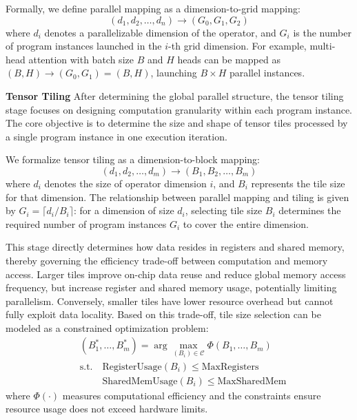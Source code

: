 \documentclass{article}
\theoremstyle{plain}
\theoremstyle{definition}
\theoremstyle{remark}
\begin{document}
Formally, we define parallel mapping as a dimension-to-grid mapping:
  \begin{equation}
  (d_1, d_2, \ldots, d_n) \rightarrow (G_0, G_1, G_2)
  \end{equation}
where $d_i$ denotes a parallelizable dimension of the operator, and $G_i$ is the number of program instances launched in the $i$-th grid dimension. For example, multi-head attention with batch size $B$ and $H$ heads can be mapped as $(B, H) \rightarrow (G_0, G_1) = (B, H)$, launching $B \times H$ parallel instances.
  
\textbf{Tensor Tiling}
After determining the global parallel structure, the tensor tiling stage focuses on designing computation granularity within each program instance. The core objective is to determine the size and shape of tensor tiles processed by a single program instance in one execution iteration.

We formalize tensor tiling as a dimension-to-block mapping:
\begin{equation}
  (d_1, d_2, \ldots, d_m) \rightarrow (B_1, B_2, \ldots, B_m)
  \end{equation}
where $d_i$ denotes the size of operator dimension $i$, and $B_i$ represents the tile size for that dimension. The relationship between parallel mapping and tiling is given by $G_i = \lceil d_i / B_i \rceil$: for a dimension of size $d_i$, selecting tile size $B_i$ determines the required number of program instances $G_i$ to cover the entire dimension.

This stage directly determines how data resides in registers and shared memory, thereby governing the efficiency trade-off between computation and memory access. Larger tiles improve on-chip data reuse and reduce global memory access frequency, but increase register and shared memory usage, potentially limiting parallelism. Conversely, smaller tiles have lower resource overhead but cannot fully exploit data locality. 
Based on this trade-off, tile size selection can be modeled as a constrained optimization problem:
  \begin{equation}
  \begin{aligned}
  &(B_1^*, \ldots, B_m^*) = \arg\max_{(B_i) \in \mathcal{C}} \Phi(B_1, \ldots, B_m) \\&\text{s.t.} \quad \text{RegisterUsage}(B_i) \leq \text{MaxRegisters} \\
  &\phantom{\text{s.t.}} \quad \text{SharedMemUsage}(B_i) \leq \text{MaxSharedMem}
  \end{aligned}
  \end{equation}
where $\Phi(\cdot)$ measures computational efficiency and the constraints ensure resource usage does not exceed hardware limits.
\end{document}
